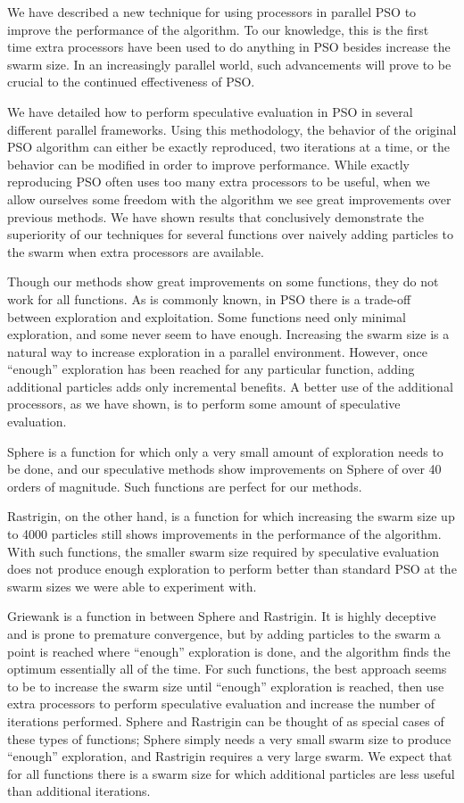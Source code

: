 \documentclass[journal,letterpaper]{IEEEtran}
\begin{document}
We have described a new technique for using processors in parallel PSO to
improve the performance of the algorithm.  To our knowledge, this is the first
time extra processors have been used to do anything in PSO besides increase the
swarm size.  In an increasingly parallel world, such advancements will prove to
be crucial to the continued effectiveness of PSO.

We have detailed how to perform speculative evaluation in PSO in several
different parallel frameworks.  Using this methodology, the behavior of the
original PSO algorithm can either be exactly reproduced, two iterations at a
time, or the behavior can be modified in order to improve performance.  While
exactly reproducing PSO often uses too many extra processors to be useful, when
we allow ourselves some freedom with the algorithm we see great improvements
over previous methods.  We have shown results that conclusively demonstrate the
superiority of our techniques for several functions over naively adding
particles to the swarm when extra processors are available.

Though our methods show great improvements on some functions, they do not work
for all functions.  As is commonly known, in PSO there is a trade-off between
exploration and exploitation.  Some functions need only minimal exploration,
and some never seem to have enough.  Increasing the swarm size is a natural way
to increase exploration in a parallel environment.  However, once ``enough''
exploration has been reached for any particular function, adding additional
particles adds only incremental benefits.  A better use of the additional
processors, as we have shown, is to perform some amount of speculative
evaluation.

Sphere is a function for which only a very small amount of exploration needs to
be done, and our speculative methods show improvements on Sphere of over 40
orders of magnitude.  Such functions are perfect for our methods.

Rastrigin, on the other hand, is a function for which increasing the swarm size
up to 4000 particles still shows improvements in the performance of the
algorithm.  With such functions, the smaller swarm size required by speculative
evaluation does not produce enough exploration to perform better than standard
PSO at the swarm sizes we were able to experiment with.

Griewank is a function in between Sphere and Rastrigin.  It is highly deceptive
and is prone to premature convergence, but by adding particles to the swarm a
point is reached where ``enough'' exploration is done, and the algorithm finds
the optimum essentially all of the time.  For such functions, the best approach
seems to be to increase the swarm size until ``enough'' exploration is reached,
then use extra processors to perform speculative evaluation and increase the
number of iterations performed.  Sphere and Rastrigin can be thought of as
special cases of these types of functions; Sphere simply needs a very small
swarm size to produce ``enough'' exploration, and Rastrigin requires a very
large swarm.  We expect that for all functions there is a swarm size for which
additional particles are less useful than additional iterations.
\end{document}
